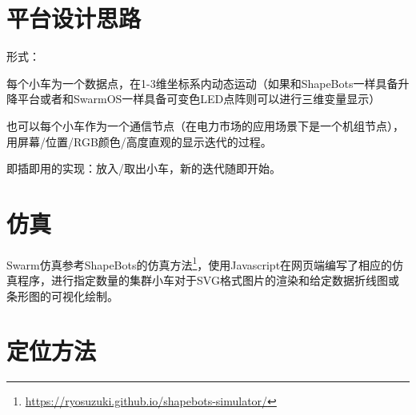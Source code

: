 
\section{平台设计思路}
形式：

每个小车为一个数据点，在1-3维坐标系内动态运动（如果和ShapeBots\cite{suzuki2019shapebots}一样具备升降平台或者和SwarmOS一样具备可变色LED点阵则可以进行三维变量显示）

也可以每个小车作为一个通信节点（在电力市场的应用场景下是一个机组节点），用屏幕/位置/RGB颜色/高度直观的显示迭代的过程。

即插即用的实现：放入/取出小车，新的迭代随即开始。

\section{仿真}

Swarm仿真参考ShapeBots\cite{suzuki2019shapebots}的仿真方法\footnote{\href{https://ryosuzuki.github.io/shapebots-simulator/}{https://ryosuzuki.github.io/shapebots-simulator/}}，使用Javascript在网页端编写了相应的仿真程序，进行指定数量的集群小车对于SVG格式图片的渲染和给定数据折线图或条形图的可视化绘制。

\section{定位方法}


